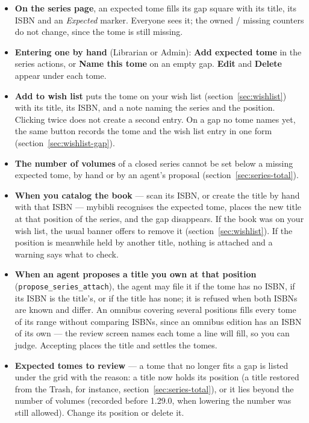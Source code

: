 \begin{itemize}
  \item \textbf{On the series page}, an expected tome fills its gap
        square with its title, its ISBN and an \emph{Expected}
        marker. Everyone sees it; the owned / missing counters do not
        change, since the tome is still missing.
  \item \textbf{Entering one by hand} (Librarian or Admin):
        \textbf{Add expected tome} in the series actions, or
        \textbf{Name this tome} on an empty gap. \textbf{Edit} and
        \textbf{Delete} appear under each tome.
  \item \textbf{Add to wish list} puts the tome on your wish list
        (section~\ref{sec:wishlist}) with its title, its ISBN, and a
        note naming the series and the position. Clicking twice does
        not create a second entry. On a gap no tome names yet, the
        same button records the tome and the wish list entry in one
        form (section~\ref{sec:wishlist-gap}).
  \item \textbf{The number of volumes} of a closed series cannot be
        set below a missing expected tome, by hand or by an agent's
        proposal (section~\ref{sec:series-total}).
  \item \textbf{When you catalog the book} --- scan its ISBN, or
        create the title by hand with that ISBN --- mybibli recognises
        the expected tome, places the new title at that position of
        the series, and the gap disappears. If the book was on your
        wish list, the usual banner offers to remove it
        (section~\ref{sec:wishlist}). If the position is meanwhile
        held by another title, nothing is attached and a warning says
        what to check.
  \item \textbf{When an agent proposes a title you own at that
        position} (\texttt{propose\_series\_\allowbreak attach}), the
        agent may file it if the tome has no ISBN, if its ISBN is the
        title's, or if the title has none; it is refused when both
        ISBNs are known and differ. An omnibus covering several
        positions fills every tome of its range without comparing
        ISBNs, since an omnibus edition has an ISBN of its own --- the
        review screen names each tome a line will fill, so you can
        judge. Accepting places the title and settles the tomes.
  \item \textbf{Expected tomes to review} --- a tome that no longer
        fits a gap is listed under the grid with the reason: a title
        now holds its position (a title restored from the Trash, for
        instance, section~\ref{sec:series-total}), or it lies beyond
        the number of volumes (recorded before 1.29.0, when lowering
        the number was still allowed). Change its position or delete
        it.
\end{itemize}

